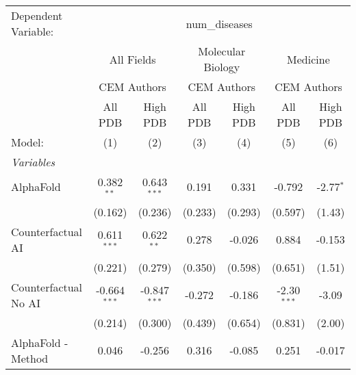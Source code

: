 \begingroup
\centering
\begin{tabular}{lcccccc}
   \tabularnewline \midrule \midrule
   Dependent Variable: & \multicolumn{6}{c}{num\_diseases}\\
 & \multicolumn{2}{c}{All Fields} & \multicolumn{2}{c}{Molecular Biology} & \multicolumn{2}{c}{Medicine} \\
\cmidrule(lr){2-3} \cmidrule(lr){4-5} \cmidrule(lr){6-7}
 & \multicolumn{2}{c}{CEM Authors} & \multicolumn{2}{c}{CEM Authors} & \multicolumn{2}{c}{CEM Authors} \\
\cmidrule(lr){2-3} \cmidrule(lr){4-5} \cmidrule(lr){6-7}
 & \multicolumn{1}{c}{All PDB} & \multicolumn{1}{c}{High PDB} & \multicolumn{1}{c}{All PDB} & \multicolumn{1}{c}{High PDB} & \multicolumn{1}{c}{All PDB} & \multicolumn{1}{c}{High PDB} \\
\cmidrule(lr){2-2} \cmidrule(lr){3-3} \cmidrule(lr){4-4} \cmidrule(lr){5-5} \cmidrule(lr){6-6} \cmidrule(lr){7-7}
   Model:                                                     & (1)            & (2)            & (3)          & (4)          & (5)           & (6)\\  
   \midrule
   \emph{Variables}\\
   AlphaFold                                                  & 0.382$^{**}$   & 0.643$^{***}$  & 0.191        & 0.331        & -0.792        & -2.77$^{*}$\\   
                                                              & (0.162)        & (0.236)        & (0.233)      & (0.293)      & (0.597)       & (1.43)\\   
   Counterfactual AI                                          & 0.611$^{***}$  & 0.622$^{**}$   & 0.278        & -0.026       & 0.884         & -0.153\\   
                                                              & (0.221)        & (0.279)        & (0.350)      & (0.598)      & (0.651)       & (1.51)\\   
   Counterfactual No AI                                       & -0.664$^{***}$ & -0.847$^{***}$ & -0.272       & -0.186       & -2.30$^{***}$ & -3.09\\   
                                                              & (0.214)        & (0.300)        & (0.439)      & (0.654)      & (0.831)       & (2.00)\\   
   AlphaFold - Method                                         & 0.046          & -0.256         & 0.316        & -0.085       & 0.251         & -0.017\\   

\end{tabular}
